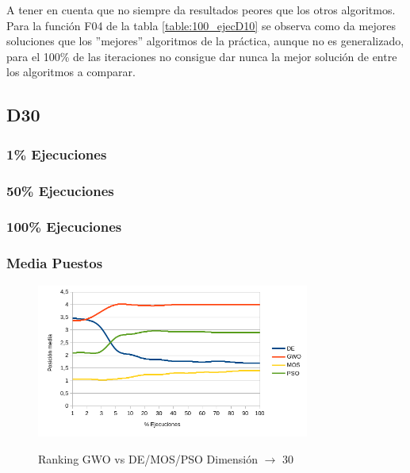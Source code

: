 \documentclass[a4paper]{report}
\begin{document}
A tener en cuenta que no siempre da resultados peores que los otros algoritmos. Para la función F04 de la tabla \ref{table:100_ejecD10} se observa como da mejores soluciones que los ''mejores'' algoritmos de la práctica, aunque no es generalizado, para el 100\% de las iteraciones no consigue dar nunca la mejor solución de entre los algoritmos a comparar.




\subsection{D30}

\subsubsection*{1\% Ejecuciones}


\subsubsection*{50\% Ejecuciones}


\subsubsection*{100\% Ejecuciones}


\subsubsection*{Media Puestos}

\begin{figure}[H]
    \caption{Ranking GWO vs DE/MOS/PSO Dimensión $\rightarrow$ 30}
    \centering
    \includegraphics[width=0.8\textwidth]{Resultados/basico/d30/Grafico_puestos.png} \label{img:ranking_D30}
\end{figure}
\end{document}

